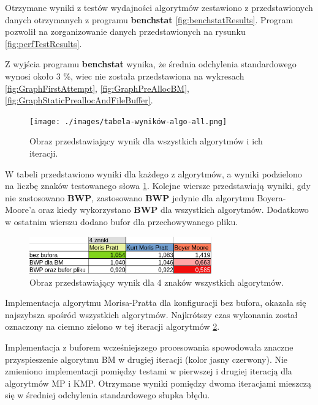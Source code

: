 Otrzymane wyniki z testów wydajności algorytmów zestawiono z przedstawionych
danych otrzymanych z programu \textbf{benchstat} \ref{fig:benchstatResults}.
Program pozwolił na zorganizowanie 
danych przedstawionych na rysunku \ref{fig:perfTestResults}.

Z wyjścia programu \textbf{benchstat} wynika, że średnia odchylenia standardowego
wynosi około 3 \%, wiec nie została przedstawiona na wykresach 
\ref{fig:GraphFirstAttempt}, 
\ref{fig:GraphPreAllocBM},
\ref{fig:GraphStaticPreallocAndFileBuffer}.

\begin{figure}[htb]
    \centering
    \texttt{[image: ./images/tabela-wyników-algo-all.png]}
    \caption{Obraz przedstawiający wynik dla wszystkich algorytmów i ich iteracji.}
    \label{fig:algoAllTabela}
\end{figure}

W tabeli przedstawiono wyniki dla każdego z algorytmów, a wyniki podzielono
na liczbę znaków testowanego słowa \ref{fig:algoAllTabela}. Kolejne wiersze
przedstawiają wyniki, gdy nie zastosowano \textbf{BWP}, zastosowano \textbf{BWP}
jedynie dla algorytmu Boyera-Moore'a oraz kiedy wykorzystano \textbf{BWP} dla
wszystkich algorytmów. Dodatkowo w ostatnim wierszu dodano bufor dla 
przechowywanego pliku. 

\begin{figure}[htb]
    \centering
    \includegraphics[width=0.7\textwidth]{./images/tabela-algo-4-znaki.png}
    \caption{Obraz przedstawiający wynik dla 4 znaków wszystkich algorytmów.}
    \label{fig:algo4znakiTabela}
\end{figure}

Implementacja algorytmu Morisa-Pratta dla konfiguracji bez bufora, okazała się
najszybsza spośród wszystkich algorytmów. Najkrótszy czas wykonania został
oznaczony na ciemno zielono w tej iteracji algorytmów \ref{fig:algo4znakiTabela}.

Implementacja z buforem wcześniejszego procesowania spowodowała znaczne
przyspieszenie algorytmu BM w drugiej iteracji (kolor jasny czerwony). Nie zmieniono implementacji
pomiędzy testami w pierwszej i drugiej iteracją dla algorytmów MP i KMP.
Otrzymane wyniki pomiędzy dwoma iteracjami mieszczą się w średniej odchylenia 
standardowego słupka błędu. 

